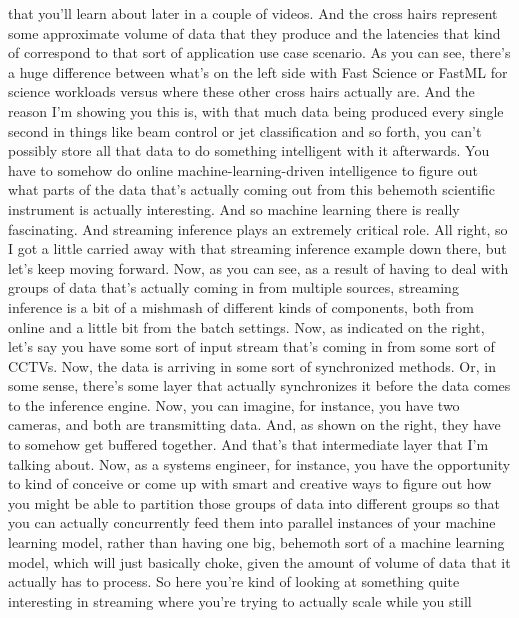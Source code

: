 {{{{{{{    that you'll learn about later in a couple of videos.
    And the cross hairs represent some approximate volume
    of data that they produce and the latencies that kind of correspond
    to that sort of application use case scenario.
    As you can see, there's a huge difference
    between what's on the left side with Fast Science or FastML
    for science workloads versus where these other cross hairs actually are.
    And the reason I'm showing you this is, with that much data
    being produced every single second in things
    like beam control or jet classification and so forth, you can't possibly
    store all that data to do something intelligent with it afterwards.
    You have to somehow do online machine-learning-driven intelligence
    to figure out what parts of the data that's actually coming out
    from this behemoth scientific instrument is actually interesting.
    And so machine learning there is really fascinating.
    And streaming inference plays an extremely critical role.
    All right, so I got a little carried away with that streaming inference
    example down there, but let's keep moving forward.
    Now, as you can see, as a result of having
    to deal with groups of data that's actually coming in
    from multiple sources, streaming inference
    is a bit of a mishmash of different kinds of components, both from online
    and a little bit from the batch settings.
    Now, as indicated on the right, let's say you have some sort of input stream
    that's coming in from some sort of CCTVs.
    Now, the data is arriving in some sort of synchronized methods.
    Or, in some sense, there's some layer that actually synchronizes it
    before the data comes to the inference engine.
    Now, you can imagine, for instance, you have two cameras,
    and both are transmitting data.
    And, as shown on the right, they have to somehow get buffered together.
    And that's that intermediate layer that I'm talking about.
    Now, as a systems engineer, for instance,
    you have the opportunity to kind of conceive or come up
    with smart and creative ways to figure out
    how you might be able to partition those groups of data into different groups
    so that you can actually concurrently feed them
    into parallel instances of your machine learning model, rather than having one
    big, behemoth sort of a machine learning model, which will just basically choke,
    given the amount of volume of data that it actually has to process.
    So here you're kind of looking at something quite interesting
    in streaming where you're trying to actually scale while you still
}}}}}}}
